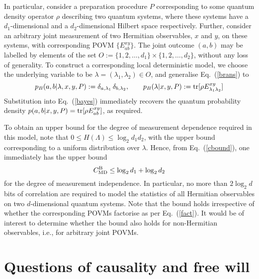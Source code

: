 \documentclass[graybox]{svmult}
\begin{document}
In particular, consider a preparation procedure $P$ corresponding to some quantum density operator $\rho$ describing two quantum systems, where these systems have a $d_1$-dimensional and a $d_2$-dimensional Hilbert space respectively. Further, consider an arbitrary joint measurement of two Hermitian observables, $x$ and $y$, on these systems, with corresponding POVM $\{ E^{xy}_{ab}\}$. The joint outcome $(a,b)$ may be labelled by elements of the set $O:=\{1,2,\dots,d_1\}\times\{1,2,\dots,d_2\}$, without any loss of generality.
To construct a corresponding local deterministic model, we choose the underlying variable to be  $\lambda=(\lambda_1,\lambda_2) \in O$, and generalise Eq.~(\ref{brans}) to
\begin{equation}
p_B(a,b|\lambda,x,y,P):=\delta_{a,\lambda_1} \, \delta_{b,\lambda_2},\qquad p_B(\lambda|x,y,P):=  {\rm tr}[\rho E^{xy}_{\lambda_1\lambda_2}]
\end{equation}
Substitution into Eq.~(\ref{bayes}) immediately recovers the quantum probability density $p(a,b|x,y,P)= {\rm tr}[\rho E^{xy}_{ab}]$, as required.

To obtain an upper bound for the degree of measurement dependence required in this model, note that $0\leq H(\Lambda)\leq \log_2 d_1d_2$, with the upper bound corresponding to a uniform distribution over $\lambda$.  Hence, from Eq.~(\ref{cbound}), one immediately has the upper bound
\begin{equation}
C^{\rm B}_{\rm MD} \leq  \log_2 d_1 + \log_2 d_2
\end{equation}
for the degree of measurement independence.  In particular, no more than $2\log_2 d$ bits of correlation are required to model the statistics of all Hermitian observables on two $d$-dimensional quantum systems.  Note that  the bound holds irrespective of whether the corresponding POVMs factorise as per Eq.~(\ref{fact}). It would be of interest to determine whether the bound also holds for non-Hermitian observables, i.e., for arbitrary joint POVMs.


\section{Questions of causality and free will}
\label{5}
\end{document}
